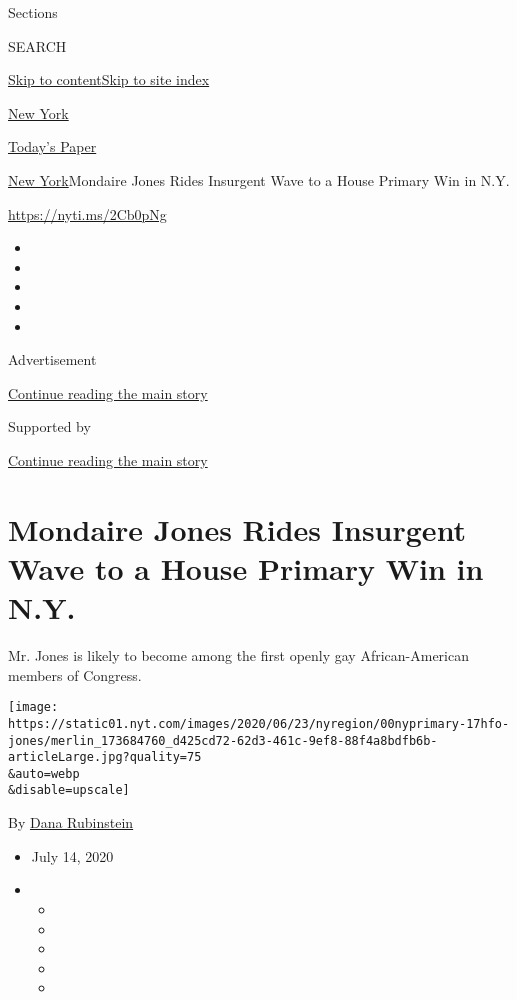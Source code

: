 Sections

SEARCH

\protect\hyperlink{site-content}{Skip to
content}\protect\hyperlink{site-index}{Skip to site index}

\href{https://www.nytimes.com/section/nyregion}{New York}

\href{https://myaccount.nytimes.com/auth/login?response_type=cookie\&client_id=vi}{}

\href{https://www.nytimes.com/section/todayspaper}{Today's Paper}

\href{/section/nyregion}{New York}\textbar{}Mondaire Jones Rides
Insurgent Wave to a House Primary Win in N.Y.

\url{https://nyti.ms/2Cb0pNg}

\begin{itemize}
\item
\item
\item
\item
\item
\end{itemize}

Advertisement

\protect\hyperlink{after-top}{Continue reading the main story}

Supported by

\protect\hyperlink{after-sponsor}{Continue reading the main story}

\hypertarget{mondaire-jones-rides-insurgent-wave-to-a-house-primary-win-in-ny}{%
\section{Mondaire Jones Rides Insurgent Wave to a House Primary Win in
N.Y.}\label{mondaire-jones-rides-insurgent-wave-to-a-house-primary-win-in-ny}}

Mr. Jones is likely to become among the first openly gay
African-American members of Congress.

\texttt{[image: https://static01.nyt.com/images/2020/06/23/nyregion/00nyprimary-17hfo-jones/merlin\_173684760\_d425cd72-62d3-461c-9ef8-88f4a8bdfb6b-articleLarge.jpg?quality=75\\\&auto=webp\\\&disable=upscale]}

By \href{https://www.nytimes.com/by/dana-rubinstein}{Dana Rubinstein}

\begin{itemize}
\item
  July 14, 2020
\item
  \begin{itemize}
  \item
  \item
  \item
  \item
  \item
  \end{itemize}
\end{itemize}


